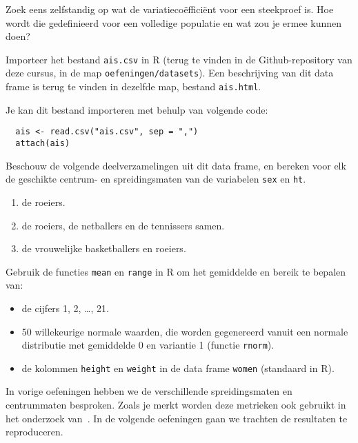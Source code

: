 \begin{exercise}
  Zoek eens zelfstandig op wat de variatieco\"effici\"ent voor een steekproef is. Hoe wordt die gedefinieerd voor een volledige populatie en wat zou je ermee kunnen doen?
\end{exercise}

\begin{exercise}
  \label{ex:ais}
  Importeer het bestand \texttt{ais.csv} in R (terug te vinden in de Github-repository van deze cursus, in de map \texttt{oefeningen/datasets}). 
  Een beschrijving van dit data frame is terug te vinden in dezelfde map, bestand \texttt{ais.html}.
  
  Je kan dit bestand importeren met behulp van volgende code:
  \begin{lstlisting}
  ais <- read.csv("ais.csv", sep = ",")
  attach(ais)
  \end{lstlisting}
  
  Beschouw de volgende deelverzamelingen uit dit data frame, 
  en bereken voor elk de geschikte centrum- en spreidingsmaten van de variabelen \texttt{sex} en \texttt{ht}.
  
  \begin{enumerate}
    \item de roeiers.
    \item de roeiers, de netballers en de tennissers samen.
    \item de vrouwelijke basketballers en roeiers.
  \end{enumerate}
\end{exercise}

\begin{exercise}
  \label{ex:mean-range-R}
  Gebruik de functies \texttt{mean} en \texttt{range} in R om het gemiddelde en bereik te bepalen van:
  \begin{itemize}
    \item de cijfers 1, 2, \dots, 21.
    \item 50 willekeurige normale waarden, die  worden gegenereerd vanuit een normale distributie met gemiddelde 0 en variantie 1 (functie \texttt{rnorm}).
    \item de kolommen \texttt{height} en \texttt{weight} in de data frame \texttt{women} (standaard in R).
  \end{itemize}
\end{exercise}

In vorige oefeningen hebben we de verschillende spreidingsmaten en centrummaten besproken. Zoals je merkt worden deze metrieken ook gebruikt in het onderzoek van~\textcite{Akin2016}. In de volgende oefeningen gaan we trachten de resultaten te reproduceren.

